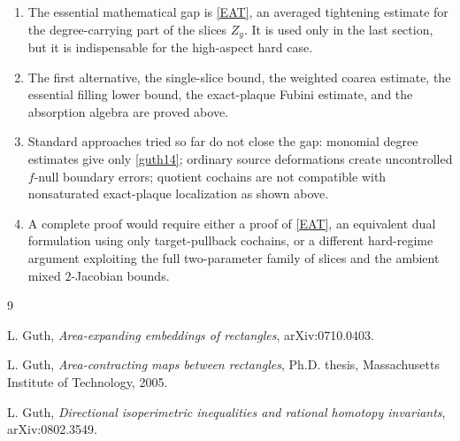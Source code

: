 \documentclass[12pt]{article}
\begin{document}
\begin{enumerate}
\item The essential mathematical gap is \eqref{EAT}, an averaged tightening
estimate for the degree-carrying part of the slices \(Z_y\).  It is used only
in the last section, but it is indispensable for the high-aspect hard case.

\item The first alternative, the single-slice bound, the weighted coarea
estimate, the essential filling lower bound, the exact-plaque Fubini estimate,
and the absorption algebra are proved above.

\item Standard approaches tried so far do not close the gap: monomial
degree estimates give only \eqref{guth14}; ordinary source deformations create
uncontrolled \(f\)-null boundary errors; quotient cochains are not compatible
with nonsaturated exact-plaque localization as shown above.

\item A complete proof would require either a proof of \eqref{EAT}, an
equivalent dual formulation using only target-pullback cochains, or a different
hard-regime argument exploiting the full two-parameter family of slices and the
ambient mixed \(2\)-Jacobian bounds.
\end{enumerate}

\begin{thebibliography}{9}

L. Guth, \emph{Area-expanding embeddings of rectangles}, arXiv:0710.0403.

L. Guth, \emph{Area-contracting maps between rectangles}, Ph.D. thesis,
Massachusetts Institute of Technology, 2005.

L. Guth, \emph{Directional isoperimetric inequalities and rational homotopy
invariants}, arXiv:0802.3549.

\end{thebibliography}
\end{document}
